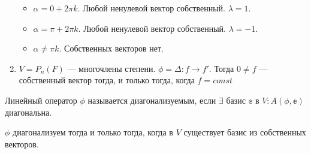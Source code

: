 \begin{Examples}
\begin{enumerate}
        \begin{itemize}
            \item $\alpha = 0 + 2\pi k$. Любой ненулевой вектор собственный. $\lambda = 1$.
            \item $\alpha = \pi + 2\pi k$. Любой ненулевой вектор собственный. $\lambda = -1$.
            \item $\alpha \neq \pi k$. Собственных векторов нет.
        \end{itemize}
        \item $V = P_n(F)$ --- многочлены степени. $\phi = \Delta\colon f \rightarrow f'$. Тогда $0 \neq f$ --- собственный вектор тогда, и только тогда, когда $f = const$ 
    \end{enumerate}
\end{Examples}
\begin{Def}
    Линейный оператор $\phi$ называется диагонализуемым, если $\exists$ базис $\mathbb{e}$ в $V\colon A(\phi, \mathbb{e})$ диагональна. 
\end{Def}
\begin{Suggestion}
    $\phi$ диагонализуем тогда и только тогда, когда в $V$ существует базис из собственных векторов.
\end{Suggestion}

